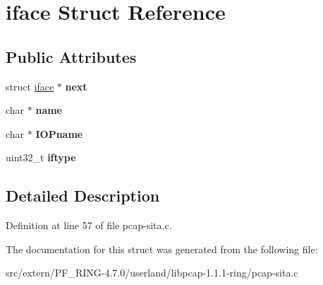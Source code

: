 \hypertarget{structiface}{
\section{iface Struct Reference}
\label{structiface}
}
\subsection*{Public Attributes}
\begin{DoxyCompactItemize}
\item 
\hypertarget{structiface_a5e6a1d22ed737183123cec0709af58ce}{
struct \hyperlink{structiface}{iface} $\ast$ {\bfseries next}}
\label{structiface_a5e6a1d22ed737183123cec0709af58ce}

\item 
\hypertarget{structiface_a088893c3f0f283cb370f86678e9bac6d}{
char $\ast$ {\bfseries name}}
\label{structiface_a088893c3f0f283cb370f86678e9bac6d}

\item 
\hypertarget{structiface_a28e3276432e8f34321b6f0b583fb674f}{
char $\ast$ {\bfseries IOPname}}
\label{structiface_a28e3276432e8f34321b6f0b583fb674f}

\item 
\hypertarget{structiface_a5fd4a8deb54b445ca9641cf4d2878c70}{
uint32\_\-t {\bfseries iftype}}
\label{structiface_a5fd4a8deb54b445ca9641cf4d2878c70}

\end{DoxyCompactItemize}


\subsection{Detailed Description}


Definition at line 57 of file pcap-\/sita.c.



The documentation for this struct was generated from the following file:\begin{DoxyCompactItemize}
\item 
src/extern/PF\_\-RING-\/4.7.0/userland/libpcap-\/1.1.1-\/ring/pcap-\/sita.c\end{DoxyCompactItemize}
